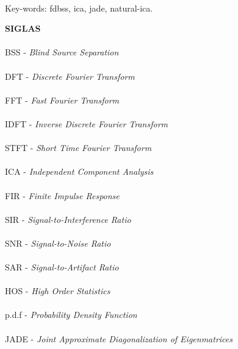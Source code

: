 \paragraph{}
\noindent Key-words: fdbss, ica, jade, natural-ica.

\pagebreak


\begin{center}
\textbf{SIGLAS}
\end{center}
      \vspace{0.5cm}

\paragraph{}BSS  - \textit{Blind Source Separation}
\paragraph{}DFT  - \textit{Discrete Fourier Transform}
\paragraph{}FFT  - \textit{Fast Fourier Transform}
\paragraph{}IDFT  - \textit{Inverse Discrete Fourier Transform}
\paragraph{}STFT - \textit{Short Time Fourier Transform}
\paragraph{}ICA  - \textit{Independent Component Analysis}
\paragraph{}FIR  - \textit{Finite Impulse Response}
\paragraph{}SIR  - \textit{Signal-to-Interference Ratio}
\paragraph{}SNR  - \textit{Signal-to-Noise Ratio}
\paragraph{}SAR  - \textit{Signal-to-Artifact Ratio}
\paragraph{}HOS  - \textit{High Order Statistics}
\paragraph{}p.d.f  - \textit{Probability Density Function}
\paragraph{}JADE  - \textit{Joint Approximate Diagonalization of Eigenmatrices}
\pagebreak







